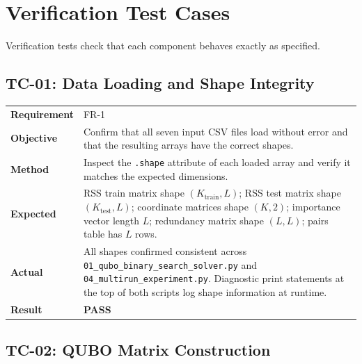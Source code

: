 \documentclass[12pt,a4paper]{article}
\newcommand{\pass}{\textcolor{green!50!black}{\textbf{PASS}}}
\begin{document}
\section{Verification Test Cases}

Verification tests check that each component behaves exactly as specified.

\subsection{TC-01: Data Loading and Shape Integrity}

\begin{table}[h!]
\renewcommand{\arraystretch}{1.3}
\begin{tabular}{@{}lp{10cm}@{}}
\toprule
\textbf{Requirement} & FR-1 \\
\textbf{Objective} & Confirm that all seven input CSV files load without
    error and that the resulting arrays have the correct shapes. \\
\textbf{Method} & Inspect the \texttt{.shape} attribute of each loaded
    array and verify it matches the expected dimensions. \\
\textbf{Expected} & RSS train matrix shape $(K_{\text{train}}, L)$;
    RSS test matrix shape $(K_{\text{test}}, L)$; coordinate matrices
    shape $(K, 2)$; importance vector length $L$; redundancy matrix
    shape $(L, L)$; pairs table has $L$ rows. \\
\textbf{Actual} & All shapes confirmed consistent across
    \texttt{01\_qubo\_binary\_search\_solver.py} and
    \texttt{04\_multirun\_experiment.py}. Diagnostic print statements
    at the top of both scripts log shape information at runtime. \\
\textbf{Result} & \pass \\
\bottomrule
\end{tabular}
\end{table}

\subsection{TC-02: QUBO Matrix Construction}
\end{document}
